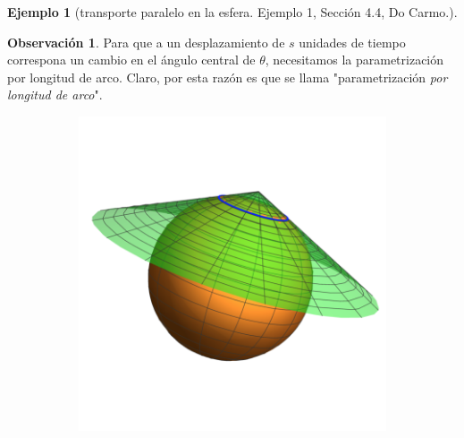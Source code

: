 \documentclass[spanish]{book}
\theoremstyle{definition}
\newtheorem*{obs}{Observación}
\newtheorem*{ejem}{Ejemplo}
\begin{document}
\begin{ejem}[transporte paralelo en la esfera. Ejemplo 1, Sección 4.4, Do Carmo.]
	\begin{obs}
		Para que a un desplazamiento de $s$ unidades de tiempo correspona un cambio en el ángulo central de $\theta$, necesitamos la parametrización por longitud de arco. Claro, por esta razón es que se llama "parametrización \textit{por longitud de arco}".
	\end{obs} 
	\vspace{-1cm}
	\begin{figure}[H]
		\begin{subfigure}{0.5\textwidth}
			\centering
			\includegraphics[width=\linewidth]{gauss8}
		\end{subfigure}
		\begin{subfigure}{0.5\textwidth}
			\centering

\end{subfigure}
\end{figure}
\end{ejem}
\end{document}
